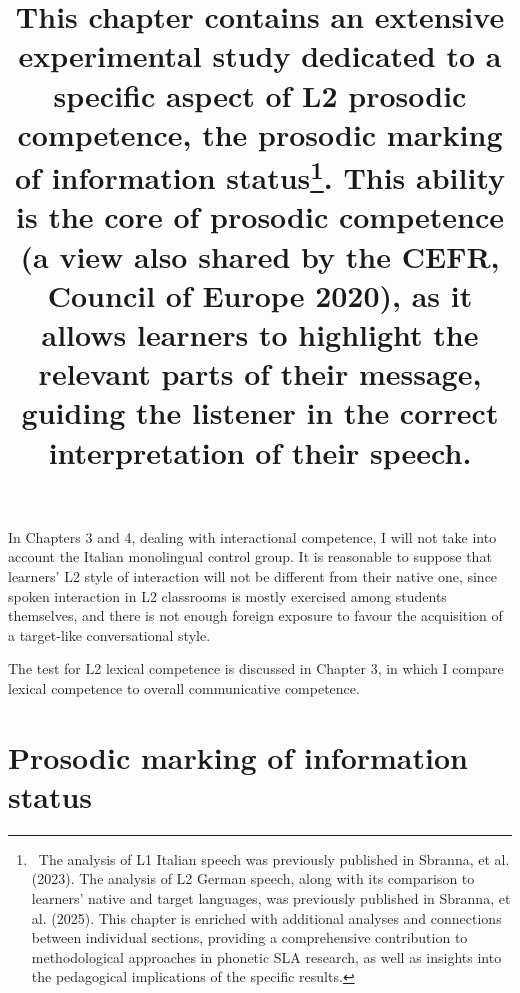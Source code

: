\begin{styleStandard}
In Chapters 3 and 4, dealing with interactional competence, I will not take into account the Italian monolingual control group. It is reasonable to suppose that learners’ L2 style of interaction will not be different from their native one, since spoken interaction in L2 classrooms is mostly exercised among students themselves, and there is not enough foreign exposure to favour the acquisition of a target-like conversational style. 
\end{styleStandard}

\begin{styleStandard}
The test for L2 lexical competence is discussed in Chapter 3, in which I compare lexical competence to overall communicative competence.
\end{styleStandard}

\clearpage\section[Prosodic marking of information status ]{Prosodic marking of information status }
\hypertarget{Toc191305882}{}\title{\textmd{This chapter contains an extensive experimental study dedicated to a specific aspect of L2 prosodic competence, the }\textmd{prosodic marking of information status}\footnote{\ The analysis of L1 Italian speech was previously published in Sbranna, et al. (2023). The analysis of L2 German speech, along with its comparison to learners’ native and target languages, was previously published in Sbranna, et al. (2025). This chapter is enriched with additional analyses and connections between individual sections, providing a comprehensive contribution to methodological approaches in phonetic SLA research, as well as insights into the pedagogical implications of the specific results.}\textmd{. This ability is the core of prosodic competence }(a view also shared by the CEFR, Council of Europe 2020)\textmd{, as it allows learners to highlight the relevant parts of their message, guiding the listener in the correct interpretation of their speech.}}
\maketitle

